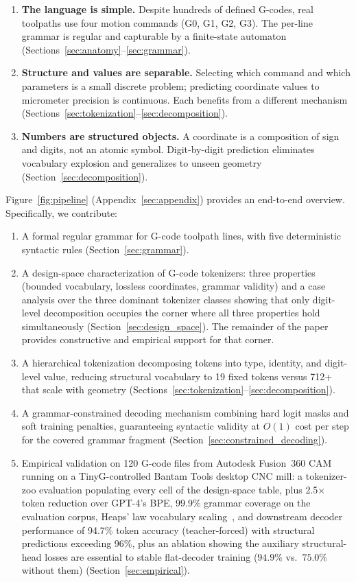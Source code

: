 \documentclass[sensors,article,submit,moreauthors,pdftex]{Definitions/mdpi}
\begin{document}
\begin{enumerate}[leftmargin=*]
    \item \textbf{The language is simple.} Despite hundreds of defined G-codes, real toolpaths use four motion commands (G0, G1, G2, G3). The per-line grammar is regular and capturable by a finite-state automaton (Sections~\ref{sec:anatomy}--\ref{sec:grammar}).

    \item \textbf{Structure and values are separable.} Selecting which command and which parameters is a small discrete problem; predicting coordinate values to micrometer precision is continuous. Each benefits from a different mechanism (Sections~\ref{sec:tokenization}--\ref{sec:decomposition}).

    \item \textbf{Numbers are structured objects.} A coordinate is a composition of sign and digits, not an atomic symbol. Digit-by-digit prediction eliminates vocabulary explosion and generalizes to unseen geometry (Section~\ref{sec:decomposition}).
\end{enumerate}

Figure~\ref{fig:pipeline} (Appendix~\ref{sec:appendix}) provides an end-to-end overview. Specifically, we contribute:
\begin{enumerate}[leftmargin=*, nosep]
    \item A formal regular grammar for G-code toolpath lines, with five deterministic syntactic rules (Section~\ref{sec:grammar}).
    \item A design-space characterization of G-code tokenizers: three properties (bounded vocabulary, lossless coordinates, grammar validity) and a case analysis over the three dominant tokenizer classes showing that only digit-level decomposition occupies the corner where all three properties hold simultaneously (Section~\ref{sec:design_space}). The remainder of the paper provides constructive and empirical support for that corner.
    \item A hierarchical tokenization decomposing tokens into type, identity, and digit-level value, reducing structural vocabulary to 19 fixed tokens versus 712+ that scale with geometry (Sections~\ref{sec:tokenization}--\ref{sec:decomposition}).
    \item A grammar-constrained decoding mechanism combining hard logit masks and soft training penalties, guaranteeing syntactic validity at $O(1)$ cost per step for the covered grammar fragment (Section~\ref{sec:constrained_decoding}).
    \item Empirical validation on 120 G-code files from Autodesk Fusion~360 CAM running on a TinyG-controlled Bantam Tools desktop CNC mill: a tokenizer-zoo evaluation populating every cell of the design-space table, plus 2.5$\times$ token reduction over GPT-4's BPE, 99.9\% grammar coverage on the evaluation corpus, Heaps' law vocabulary scaling~\cite{heaps1978}, and downstream decoder performance of 94.7\% token accuracy (teacher-forced) with structural predictions exceeding 96\%, plus an ablation showing the auxiliary structural-head losses are essential to stable flat-decoder training ($94.9\%$ vs.\ $75.0\%$ without them) (Section~\ref{sec:empirical}).
\end{enumerate}
\end{document}
